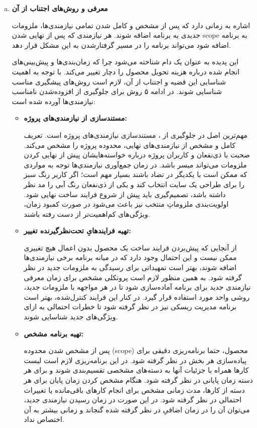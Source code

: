 {\begin{enumerate}[a)]
\item

\textbf{معرفی  و روش‌های اجتناب از آن}

 اشاره به زمانی دارد که پس از مشخص و کامل شدن تمامی نیازمندی‌ها، ملزومات جدیدی به برنامه اضافه شوند. هر نیازمندی که پس از نهایی شدن scope به برنامه اضافه شود می‌تواند برنامه را در مسیر گرفتارشدن به این مشکل قرار دهد.

این پدیده به عنوان یک دام شناخته می‌شود چرا که زمان‌بندی‌ها و پیش‌بینی‌های انجام شده درباره هزینه تحویل محصول را دچار تغییر می‌کند. با توجه به اهمیت شناسایی این قضیه و اجتناب از آن، لازم است روش‌های پیشگیری مناسب شناسایی شوند\cite{reqcreep}. در ادامه ۵ روش برای جلوگیری از افزوده‌شدن نامناسب نیازمندی‌ها آورده شده است\cite{avoid}:

\begin{itemize}

	\item \textbf{مستندسازی از نیازمندی‌های پروژه:}

مهم‌ترین اصل در جلوگیری از ، مستندسازی نیازمندی‌های پروژه است. تعریف کامل و مشخص از نیازمندی‌های نهایی، محدوده پروژه را مشخص می‌کند. صحبت با ذی‌نفعان و کاربران پروژه درباره خواسته‌هایشان پیش از نهایی کردن ملزومات می‌تواند میسر باشد. در زمان جمع‌آوری نیازمندی‌ها توجه به مواردی که ممکن است با یکدیگر در تضاد باشند بسیار مهم است؛ اگر کاربر رنگ سبز را برای طراحی یک سایت انتخاب کند و یکی از ذی‌نفعان رنگ آبی را مد نظر داشته باشد، تصمیم‌گیری باید پیش از شروع فرایند ساخت نهایی شود. اولویت‌بندی ملزوماتِ منتخب نیز باعث می‌شود در صورت کمبود زمان، ویژگی‌های کم‌اهمیت‌تر از دست رفته باشند. 

	\item \textbf{تهیه فرایندهایِ تحت‌نظرگیرنده تغییر:}

از آنجایی که پیش‌بردن فرایند ساخت یک محصول بدون اعمال هیچ تغییری ممکن نیست و این احتمال وجود دارد که در میانه برنامه برخی نیازمندی‌ها اضافه شوند، بهتر است تمهیداتی برای رسیدگی به ملزومات جدید در نظر گرفته شود. به همین منظور لازم است پروتکلی مشخص برای زمان معرفی نیازمندی جدید برای برنامه آماده‌‌سازی شود تا در هر مواجهه با ملزومات جدید، روشی واحد مورد استفاده قرار گیرد. در کنار این فرایند کنترل‌شده، بهتر است برنامه مدیریت ریسکی نیز در نظر گرفته شود تا خطرات احتمالی به ازای ویژگی‌های جدید شناسایی شوند.

	\item \textbf{تهیه برنامه مشخص:}

پس از مشخص شدن محدوده (scope) محصول، حتما برنامه‌ریزی دقیقی برای پیاده‌سازی هر بخش در نظر گرفته شود. در این برنامه‌ریزی لازم است لیست کارها همراه با جزئیات آنها به دسته‌های مشخصی تقسیم‌بندی شوند و برای هر دسته زمان پایانی در نظر گرفته شود. هنگام مشخص کردن زمان پایان برای هر دسته از کارها، مدت زمانی مشخص برای انجام کارهای باقی‌مانده یا تغییرات احتمالی در نظر گرفته شود. در این صورت در زمان رسیدن نیازمندی جدید، می‌توان آن را در زمان اضافیِ در نظر گرفته شده گنجاند و زمانی بیشتر به آن اختصاص نداد.
	

\end{itemize}
\end{enumerate}}

